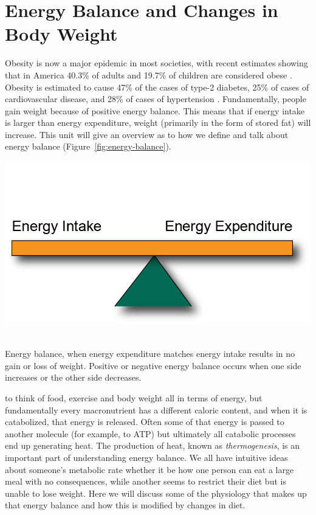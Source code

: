 \documentclass{tufte-handout}
\begin{document}
\section{Energy Balance and Changes in Body Weight}

Obesity is now a major epidemic in most societies, with recent estimates showing that in America 40.3\% of adults and 19.7\% of children are considered obese \citep{stiermanNationalHealthNutrition2021,emmerichObesitySevereObesity2024}.  Obesity is estimated to cause 47\% of the cases of type-2 diabetes, 25\% of cases of cardiovascular disease, and 28\% of cases of hypertension \citep{tanamasEstimatingProportionMetabolic2016}. Fundamentally, people gain weight because of positive energy balance.  This means that if energy intake is larger than energy expenditure, weight (primarily in the form of stored fat) will increase.  This unit will give an overview as to how we define and talk about energy balance (Figure~\ref{fig:energy-balance}).

\begin{marginfigure}
\includegraphics{figures/Energy-Balance.png}\
\caption{Energy balance, when energy expenditure matches energy intake results in no gain or loss of weight.  Positive or negative energy balance occurs when one side increases or the other side decreases.}\label{fig:energy-balance}
\end{marginfigure}

 to think of food, exercise and body weight all in terms of energy, but fundamentally every macronutrient has a different caloric content, and when it is catabolized, that energy is released.  Often some of that energy is passed to another molecule (for example, to ATP) but ultimately all catabolic processes end up generating heat.  The production of heat, known as \emph{thermogenesis}, is an important part of understanding energy balance.  We all have intuitive ideas about someone's metabolic rate whether it be how one person can eat a large meal with no consequences, while another seems to restrict their diet but is unable to lose weight.  Here we will discuss some of the physiology that makes up that energy balance and how this is modified by changes in diet.
\end{document}
